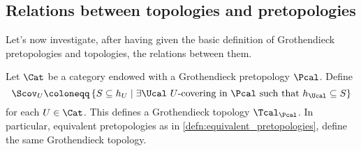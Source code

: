 \documentclass[a4paper]{article}
\begin{document}
        \subsection{Relations between topologies and pretopologies}
            Let's now investigate, after having given the basic definition of Grothendieck pretopologies and topologies, the relations between them.
            \begin{thm}
                \label{thm:pretop_to_top}
                Let $\Cat$ be a category endowed with a Grothendieck pretopology $\Pcal$. Define \[\Scov_U \coloneqq \left\{S \subseteq h_U \mid \exists \Ucal \text{ $U$-covering in $\Pcal$ such that $h_{\Ucal} \subseteq S$} \right\} \] for each $U \in \Cat$. This defines a Grothendieck topology $\Tcal_{\Pcal}$. In particular, equivalent pretopologies as in \cref{defn:equivalent_pretopologies}, define the same Grothendieck topology.
            \end{thm}
\end{document}
